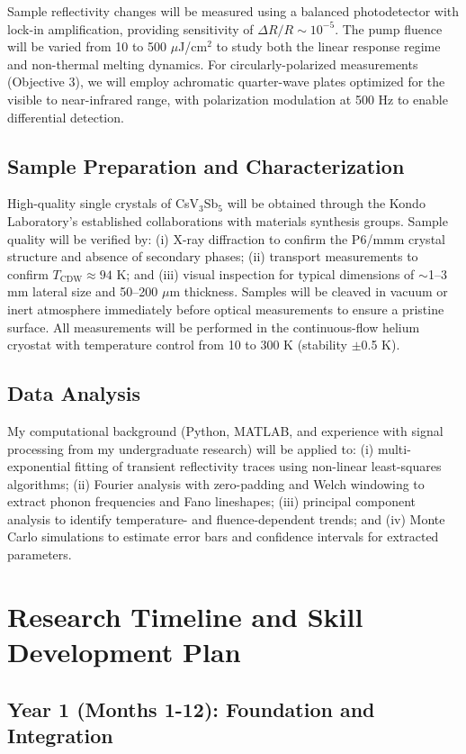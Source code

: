 \documentclass[12pt,a4paper]{article}
\begin{document}
Sample reflectivity changes will be measured using a balanced photodetector with lock-in amplification, providing sensitivity of $\Delta R/R \sim 10^{-5}$. The pump fluence will be varied from 10 to 500 $\mu$J/cm$^2$ to study both the linear response regime and non-thermal melting dynamics. For circularly-polarized measurements (Objective 3), we will employ achromatic quarter-wave plates optimized for the visible to near-infrared range, with polarization modulation at 500 Hz to enable differential detection.

\subsection{Sample Preparation and Characterization}
High-quality single crystals of CsV$_3$Sb$_5$ will be obtained through the Kondo Laboratory's established collaborations with materials synthesis groups. Sample quality will be verified by: (i) X-ray diffraction to confirm the P6/mmm crystal structure and absence of secondary phases; (ii) transport measurements to confirm $T_{\text{CDW}} \approx 94$ K; and (iii) visual inspection for typical dimensions of $\sim$1--3 mm lateral size and 50--200 $\mu$m thickness. Samples will be cleaved in vacuum or inert atmosphere immediately before optical measurements to ensure a pristine surface. All measurements will be performed in the continuous-flow helium cryostat with temperature control from 10 to 300 K (stability $\pm$0.5 K).

\subsection{Data Analysis}
My computational background (Python, MATLAB, and experience with signal processing from my undergraduate research) will be applied to: (i) multi-exponential fitting of transient reflectivity traces using non-linear least-squares algorithms; (ii) Fourier analysis with zero-padding and Welch windowing to extract phonon frequencies and Fano lineshapes; (iii) principal component analysis to identify temperature- and fluence-dependent trends; and (iv) Monte Carlo simulations to estimate error bars and confidence intervals for extracted parameters.

\section{Research Timeline and Skill Development Plan}

\subsection{Year 1 (Months 1-12): Foundation and Integration}
\end{document}
